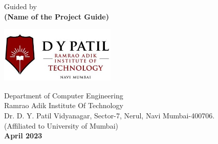 \begin{center}
\vspace{0.3in}
\Large Guided by\\
\vspace{0.1in}
{\Large \bf (Name of the Project Guide)}\\
\vspace{0.2in}
\begin{center}
	\includegraphics[width=55mm, height=27mm,keepaspectratio]{rait_logo}
\end{center}
\vspace{0.2in}
\Large{Department of Computer Engineering}\\
\Large{Ramrao Adik Institute Of Technology}\\
{\normalsize Dr. D. Y. Patil Vidyanagar, Sector-7, Nerul, Navi Mumbai-400706.}\\
\normalsize{(Affiliated to University of Mumbai)}\\
\large\textbf{April 2023}
\end{center}
